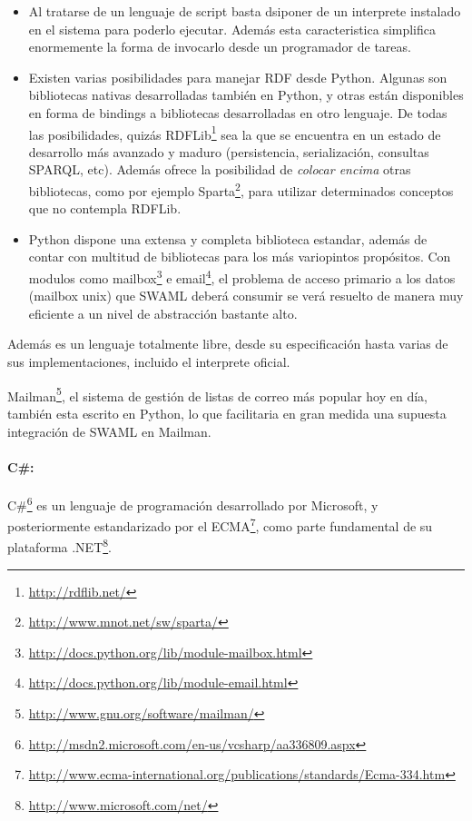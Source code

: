 \begin{itemize}
  \item Al tratarse de un lenguaje de script basta dsiponer de un interprete 
	instalado en el sistema para poderlo ejecutar. Además esta caracteristica
	simplifica enormemente la forma de invocarlo desde un programador de
	tareas.
  \item Existen varias posibilidades para manejar RDF desde Python. Algunas son
	bibliotecas nativas desarrolladas también en Python, y otras están
	disponibles en forma de bindings a bibliotecas desarrolladas en otro 
	lenguaje.
	De todas las posibilidades, quizás RDFLib\footnote{\url{http://rdflib.net/}}
	sea la que se encuentra en un estado de desarrollo más avanzado y maduro 
	(persistencia, serialización, consultas SPARQL, etc).
	Además ofrece la posibilidad de \emph{colocar encima} otras bibliotecas,
	como por ejemplo Sparta\footnote{\url{http://www.mnot.net/sw/sparta/}},
	para utilizar determinados conceptos que no contempla RDFLib.
  \item Python dispone una extensa y completa biblioteca estandar, además de contar
	con multitud de bibliotecas para los más variopintos propósitos. Con modulos 
	como mailbox\footnote{\url{http://docs.python.org/lib/module-mailbox.html}}
	e email\footnote{\url{http://docs.python.org/lib/module-email.html}}, el
	problema de acceso primario a los datos (mailbox unix) que SWAML deberá
	consumir se verá resuelto de manera muy eficiente a un nivel de abstracción
	bastante alto.
\end{itemize}

Además es un lenguaje totalmente libre, desde su especificación hasta varias
de sus implementaciones, incluido el interprete oficial.

Mailman\footnote{\url{http://www.gnu.org/software/mailman/}}, el sistema de gestión
de listas de correo más popular hoy en día, también esta escrito en Python, lo que 
facilitaria en gran medida una supuesta integración de SWAML en Mailman.


\paragraph{C\#:}C\#\footnote{\url{http://msdn2.microsoft.com/en-us/vcsharp/aa336809.aspx}} 
es un lenguaje de programación desarrollado por Microsoft, y posteriormente estandarizado por el ECMA\footnote{\url{http://www.ecma-international.org/publications/standards/Ecma-334.htm}},
como parte fundamental de su plataforma .NET\footnote{\url{http://www.microsoft.com/net/}}.

